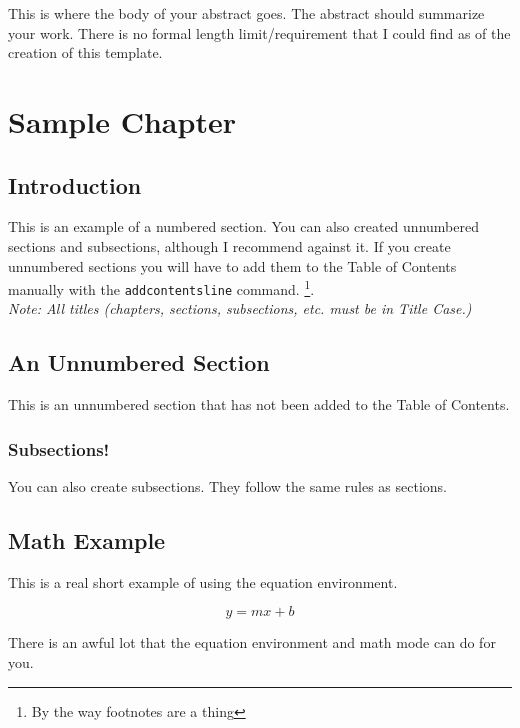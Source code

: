 \documentclass[12pt]{report} %
\begin{document}
This is where the body of your abstract goes. The abstract should summarize your work. There is no formal 
length limit/requirement that I could find as of the creation of this template.





\chapter{Sample Chapter}
\thispagestyle{fancy} %

\section{Introduction}
This is an example of a numbered section. You can also created unnumbered sections and subsections, although
I recommend against it. If you create unnumbered sections you will have to add them to the Table of Contents 
manually with the \texttt{addcontentsline} command. \footnote{By the way footnotes are a thing}.\\

\textit{Note: All titles (chapters, sections, subsections, etc. must be in Title Case.)} 

\section*{An Unnumbered Section}
This is an unnumbered section that has not been added to the Table of Contents.

\subsection{Subsections!}
You can also create subsections. They follow the same rules as sections.


\section{Math Example}
This is a real short example of using the equation environment.

\begin{equation}
	y = mx + b
\end{equation}

There is an awful lot that the equation environment and math mode can do for you.
\end{document}
